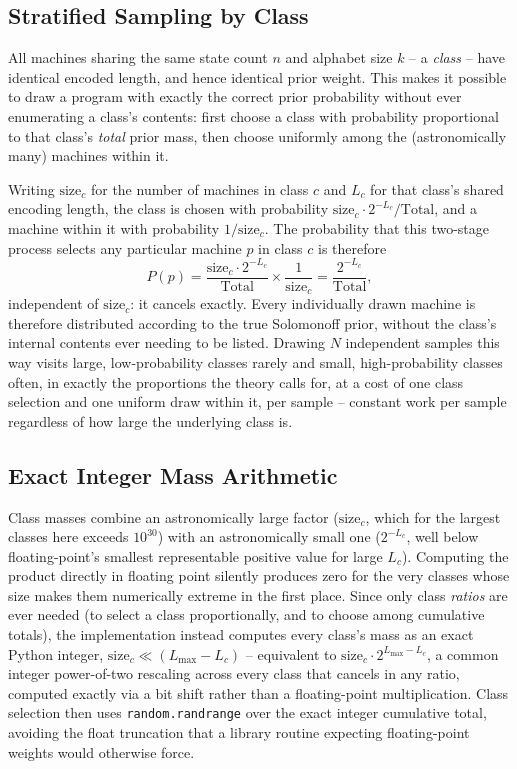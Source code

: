 \documentclass[11pt]{article}
\begin{document}
\subsection{Stratified Sampling by Class}

All machines sharing the same state count $n$ and alphabet size $k$ -- a \emph{class} --
have identical encoded length, and hence identical prior weight. This makes it possible to
draw a program with exactly the correct prior probability without ever enumerating a
class's contents: first choose a class with probability proportional to that class's
\emph{total} prior mass, then choose uniformly among the (astronomically many) machines
within it.

Writing $\text{size}_c$ for the number of machines in class $c$ and $L_c$ for that class's
shared encoding length, the class is chosen with probability
$\text{size}_c \cdot 2^{-L_c} / \text{Total}$, and a machine within it with probability
$1/\text{size}_c$. The probability that this two-stage process selects any particular
machine $p$ in class $c$ is therefore
\[
  P(p) = \frac{\text{size}_c \cdot 2^{-L_c}}{\text{Total}} \times \frac{1}{\text{size}_c}
       = \frac{2^{-L_c}}{\text{Total}},
\]
independent of $\text{size}_c$: it cancels exactly. Every individually drawn machine is
therefore distributed according to the true Solomonoff prior, without the class's
internal contents ever needing to be listed. Drawing $N$ independent samples this way
visits large, low-probability classes rarely and small, high-probability classes often, in
exactly the proportions the theory calls for, at a cost of one class selection and one
uniform draw within it, per sample -- constant work per sample regardless of how large the
underlying class is.

\subsection{Exact Integer Mass Arithmetic}

Class masses combine an astronomically large factor ($\text{size}_c$, which for the
largest classes here exceeds $10^{30}$) with an astronomically small one
($2^{-L_c}$, well below floating-point's smallest representable positive value for large
$L_c$). Computing the product directly in floating point silently produces zero for the
very classes whose size makes them numerically extreme in the first place. Since only
class \emph{ratios} are ever needed (to select a class proportionally, and to choose among
cumulative totals), the implementation instead computes every class's mass as an exact
Python integer, $\text{size}_c \ll (L_{\max} - L_c)$ -- equivalent to
$\text{size}_c \cdot 2^{L_{\max}-L_c}$, a common integer power-of-two rescaling across
every class that cancels in any ratio, computed exactly via a bit shift rather than a
floating-point multiplication. Class selection then uses \texttt{random.randrange} over
the exact integer cumulative total, avoiding the float truncation that a library routine
expecting floating-point weights would otherwise force.
\end{document}
